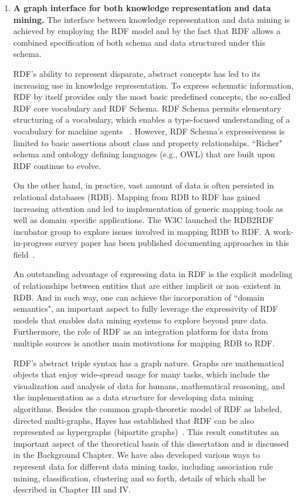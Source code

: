 \begin{enumerate}
\item \textbf{A graph interface for both knowledge representation and data mining.}
    The interface between knowledge representation and data mining is achieved by employing the RDF model and by the fact that RDF allows a combined specification of both schema and data structured under this schema.

    RDF's ability to represent disparate, abstract concepts has led to its increasing use in knowledge representation. To express schematic information, RDF by itself provides only the most basic predefined concepts, the so-called RDF core vocabulary and RDF Schema. RDF Schema permits elementary structuring of a vocabulary, which enables a type-focused understanding of a vocabulary for machine agents %
    ~\cite{GraphModelRDF}. However, RDF Schema's expressiveness is limited to basic assertions about class and property relationships. ``Richer" schema and ontology defining languages (e.g., OWL) that are built upon RDF continue to evolve. %

    On the other hand, in practice, vast amount of data is often persisted in relational databases (RDB). Mapping from RDB to RDF has gained increasing attention and led to implementation of generic mapping tools as well as domain--specific applications.  The W3C launched the RDB2RDF incubator group to explore issues involved in mapping RDB to RDF. A work-in-progress survey paper has been published documenting approaches in this field~\cite{RDB2RDF}.

    An outstanding advantage of expressing data in RDF is the explicit modeling of relationships between entities that are either implicit or non--existent in RDB. And in such way, one can achieve the incorporation of ``domain semantics", an important aspect to fully leverage the expressivity of RDF models that enables data mining systems to explore beyond pure data. Furthermore, the role of RDF as an integration platform for data from multiple sources is another main motivations for mapping RDB to RDF.

    RDF's abstract triple syntax has a graph nature. Graphs are mathematical objects that enjoy wide-spread usage for many tasks, which include the visualization and analysis of data for humans, mathematical reasoning, and the implementation as a data structure for developing data mining algorithms. Besides the common graph-theoretic model of RDF as labeled, directed multi-graphs, Hayes has established that RDF can be also represented as hypergraphs (bipartite graphs)~\cite{GraphModelRDF}. This result constitutes an important aspect of the theoretical basis of this dissertation and is discussed in the Background Chapter. We have also developed various ways to represent data for different data mining tasks, including association rule mining, classification, clustering and so forth, details of which shall be described in Chapter III and IV.


\end{enumerate}

